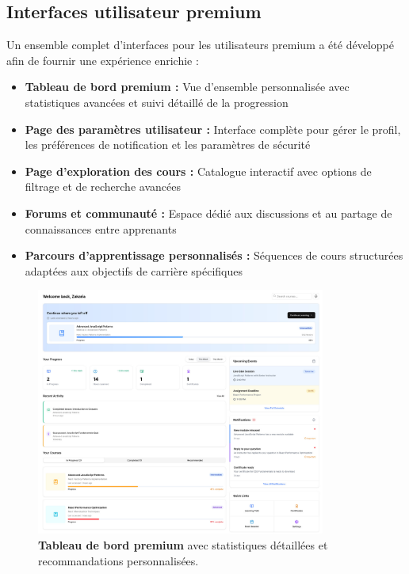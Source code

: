 \subsection{Interfaces utilisateur premium}

Un ensemble complet d'interfaces pour les utilisateurs premium a été développé afin de fournir une expérience enrichie :

\begin{itemize}
    \item \textbf{Tableau de bord premium :} Vue d'ensemble personnalisée avec statistiques avancées et suivi détaillé de la progression
    \item \textbf{Page des paramètres utilisateur :} Interface complète pour gérer le profil, les préférences de notification et les paramètres de sécurité
    \item \textbf{Page d'exploration des cours :} Catalogue interactif avec options de filtrage et de recherche avancées
    \item \textbf{Forums et communauté :} Espace dédié aux discussions et au partage de connaissances entre apprenants
    \item \textbf{Parcours d'apprentissage personnalisés :} Séquences de cours structurées adaptées aux objectifs de carrière spécifiques
\end{itemize}

\begin{figure}[h!]
  \centering
  \includegraphics[width=0.85\textwidth,keepaspectratio]{old-reports/week_4_img/dashboard.jpeg}
  \caption{\textbf{Tableau de bord premium} avec statistiques détaillées et recommandations personnalisées.}
  \label{fig:premium_dashboard}
\end{figure}

